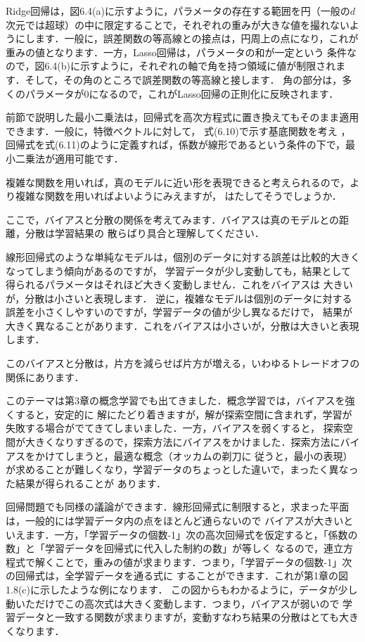 
Ridge回帰は，図6.4(a)に示すように，パラメータの存在する範囲を円（一般の$d$次元では超球）の中に限定することで，それぞれの重みが大きな値を撮れないようにします．一般に，誤差関数の等高線との接点は，円周上の点になり，これが重みの値となります．一方，Lasso回帰は，パラメータの和が一定という
条件なので，図6.4(b)に示すように，それぞれの軸で角を持つ領域に値が制限されます．そして，その角のところで誤差関数の等高線と接します．
角の部分は，多くのパラメータが0になるので，これがLasso回帰の正則化に反映されます．


前節で説明した最小二乗法は，回帰式を高次方程式に置き換えてもそのまま適用できます．一般に，特徴ベクトルに対して，
式(6.10)で示す基底関数を考え
，回帰式を式(6.11)のように定義すれば，係数が線形であるという条件の下で，最小二乗法が適用可能です．



複雑な関数を用いれば，真のモデルに近い形を表現できると考えられるので，より複雑な関数を用いればよいようにみえますが，
はたしてそうでしょうか．


ここで，バイアスと分散の関係を考えてみます．バイアスは真のモデルとの距離，分散は学習結果の
散らばり具合と理解してください．

線形回帰式のような単純なモデルは，個別のデータに対する誤差は比較的大きくなってしまう傾向があるのですが，
学習データが少し変動しても，結果として得られるパラメータはそれほど大きく変動しません．これをバイアスは
大きいが，分散は小さいと表現します．
逆に，複雑なモデルは個別のデータに対する誤差を小さくしやすいのですが，学習データの値が少し異なるだけで，
結果が大きく異なることがあります．これをバイアスは小さいが，分散は大きいと表現します．

このバイアスと分散は，片方を減らせば片方が増える，いわゆるトレードオフの関係にあります．

このテーマは第3章の概念学習でも出てきました．概念学習では，バイアスを強くすると，安定的に
解にたどり着きますが，解が探索空間に含まれず，学習が失敗する場合がでてきてしまいました．一方，バイアスを弱くすると，
探索空間が大きくなりすぎるので，探索方法にバイアスをかけました．探索方法にバイアスをかけてしまうと，最適な概念（オッカムの剃刀に
従うと，最小の表現）が求めることが難しくなり，学習データのちょっとした違いで，まったく異なった結果が得られることが
あります．

回帰問題でも同様の議論ができます．線形回帰式に制限すると，求まった平面は，一般的には学習データ内の点をほとんど通らないので
バイアスが大きいといえます．一方，「学習データの個数-1」次の高次回帰式を仮定すると，「係数の数」と「学習データを回帰式に代入した制約の数」が等しく
なるので，連立方程式で解くことで，重みの値が求まります．つまり，「学習データの個数-1」次の回帰式は，全学習データを通る式に
することができます．これが第1章の図1.8(c)に示したような例になります．
この図からもわかるように，データが少し動いただけでこの高次式は大きく変動します．つまり，バイアスが弱いので
学習データと一致する関数が求まりますが，変動すなわち結果の分散はとても大きくなります．

